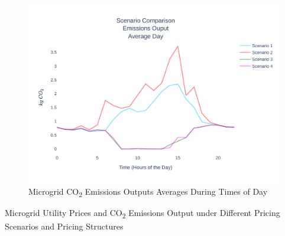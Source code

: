 \documentclass[conference]{IEEEtran}
\begin{document}
	\begin{figure}[H]
		\centering
		\includegraphics[width=1\linewidth]{Fig/emissions_scenario_comparison_run_2}
		\caption{Microgrid  CO\textsubscript{2} Emissions Outputs Averages During Times of Day}
		\label{fig:emissionsscenariocomparison}
	\end{figure}
	
	\begin{table}[H]
		\caption{Microgrid Utility Prices and CO\textsubscript{2} Emissions Output under Different Pricing Scenarios and Pricing Structures}
		\tiny
		\centering
		
		\normalsize
		\label{tab:emissions}
	\end{table}
	
\end{document}
